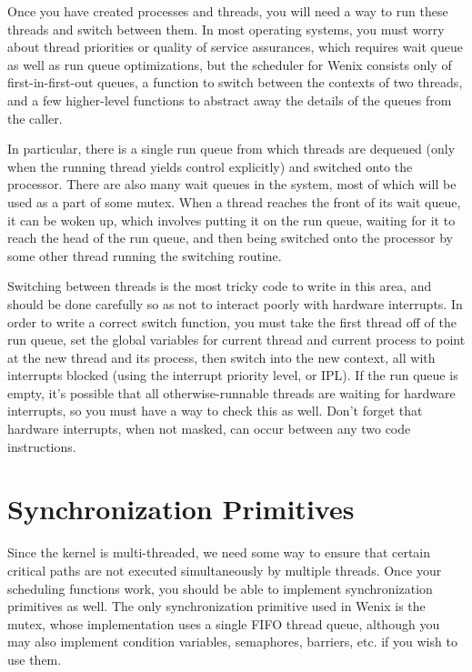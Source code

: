 Once you have created processes and threads, you will need a way to run these threads and switch between them. In most operating systems, you must worry about thread priorities or quality of service assurances, which requires wait queue as well as run queue optimizations, but the scheduler for Wenix consists only of first-in-first-out queues, a function to switch between the contexts of two threads, and a few higher-level functions to abstract away the details of the queues from the caller.

In particular, there is a single run queue from which threads are dequeued (only when the running thread yields control explicitly) and switched onto the processor. There are also many wait queues in the system, most of which will be used as a part of some mutex. When a thread reaches the front of its wait queue, it can be woken up, which involves putting it on the run queue, waiting for it to reach the head of the run queue, and then being switched onto the processor by some other thread running the switching routine.

Switching between threads is the most tricky code to write in this area, and should be done carefully so as not to interact poorly with hardware interrupts. In order to write a correct switch function, you must take the first thread off of the run queue, set the global variables for current thread and current process to point at the new thread and its process, then switch into the new context, all with interrupts blocked (using the interrupt priority level, or IPL). If the run queue is empty, it's possible that all otherwise-runnable threads are waiting for hardware interrupts, so you must have a way to check this as well. Don't forget that hardware interrupts, when not masked, can occur between any two code instructions.


\section{Synchronization Primitives}

Since the kernel is multi-threaded, we need some way to ensure that certain critical paths are not executed simultaneously by multiple threads. Once your scheduling functions work, you should be able to implement synchronization primitives as well. The only synchronization primitive used in Wenix is the mutex, whose implementation uses a single FIFO thread queue, although you may also implement condition variables, semaphores, barriers, etc. if you wish to use them.

